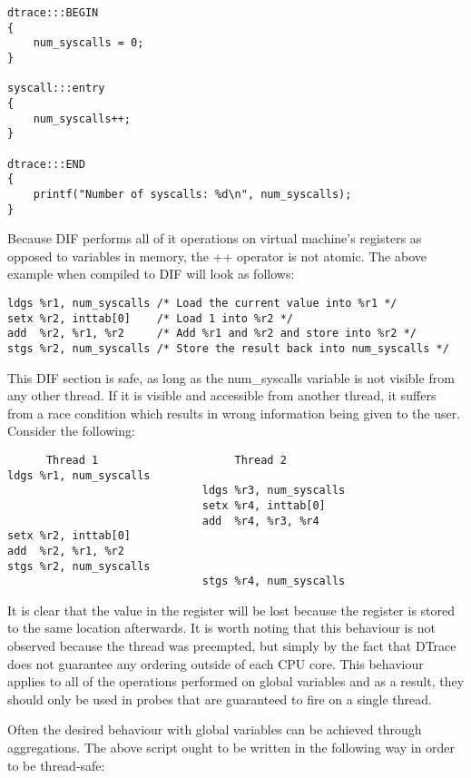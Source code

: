 \begin{verbatim}
dtrace:::BEGIN
{
    num_syscalls = 0;
}

syscall:::entry
{
    num_syscalls++;
}

dtrace:::END
{
    printf("Number of syscalls: %d\n", num_syscalls);
}
\end{verbatim}

\noindent
Because DIF performs all of it operations on virtual machine's registers as opposed
to variables in memory, the ++ operator is not atomic. The above example when compiled
to DIF will look as follows:

\begin{verbatim}
ldgs %r1, num_syscalls /* Load the current value into %r1 */
setx %r2, inttab[0]    /* Load 1 into %r2 */
add  %r2, %r1, %r2     /* Add %r1 and %r2 and store into %r2 */
stgs %r2, num_syscalls /* Store the result back into num_syscalls */
\end{verbatim}

\noindent
This DIF section is safe, as long as the num\_syscalls variable is not visible from any
other thread. If it is visible and accessible from another thread, it suffers from a race
condition which results in wrong information being given to the user. Consider the following:

\begin{verbatim}
      Thread 1                     Thread 2
ldgs %r1, num_syscalls
                              ldgs %r3, num_syscalls
                              setx %r4, inttab[0]
                              add  %r4, %r3, %r4
setx %r2, inttab[0]
add  %r2, %r1, %r2
stgs %r2, num_syscalls
                              stgs %r4, num_syscalls
\end{verbatim}

\noindent
It is clear that the value in the  register will be lost because the register
 is stored to the same location afterwards. It is worth noting that this
behaviour is not observed because the thread was preempted, but simply by the fact that DTrace
does not guarantee any ordering outside of each CPU core. This behaviour applies to all of the
operations performed on global variables and as a result, they should only be used in probes that
are guaranteed to fire on a single thread.

\noindent
Often the desired behaviour with global variables can be achieved through aggregations. The above
script ought to be written in the following way in order to be thread-safe:

